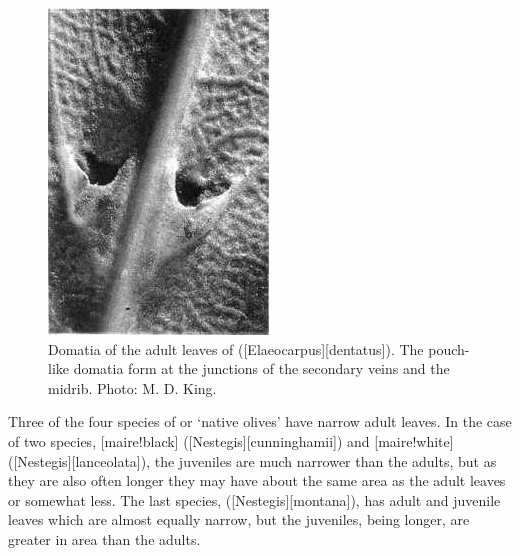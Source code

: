 \begin{figure}[!t]
\begin{minipage}[t]{\textwidth}
\begin{minipage}[t]{(\textwidth-\fgap) * \real{0.509}}
			\centering
			\includegraphics[width=\textwidth]{graphics/figure23hinau.jpg}
			\caption[Domatia of the adult leaves of hinau]{Domatia of the adult leaves of  ([Elaeocarpus][dentatus]).
			The pouch-like domatia form at the junctions of the secondary veins and the midrib.
			Photo: M. D. King.}%
			\label{fig:23hinau}
		\end{minipage}
	\end{minipage}
\end{figure}

Three of the four species of  or `native olives' have narrow adult leaves.
In the case of two species, [maire!black] ([Nestegis][cunninghamii]) and [maire!white] ([Nestegis][lanceolata]), the juveniles are much narrower than the adults, but as they are also often longer they may have about the same area as the adult leaves or somewhat less.
The last species, ([Nestegis][montana]), has adult and juvenile leaves which are almost equally narrow, but the juveniles, being longer, are greater in area than the adults.

